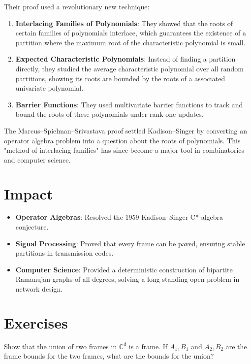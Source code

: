 Their proof used a revolutionary new technique:

\begin{enumerate}
\item \textbf{Interlacing Families of Polynomials}: They showed that the roots of certain families of polynomials interlace, which guarantees the existence of a partition where the maximum root of the characteristic polynomial is small.
\item \textbf{Expected Characteristic Polynomials}: Instead of finding a partition directly, they studied the average characteristic polynomial over all random partitions, showing its roots are bounded by the roots of a associated univariate polynomial.
\item \textbf{Barrier Functions}: They used multivariate barrier functions to track and bound the roots of these polynomials under rank-one updates.
\end{enumerate}

\begin{highlightbox}
The Marcus--Spielman--Srivastava proof settled Kadison--Singer by converting an operator algebra problem into a question about the roots of polynomials. This "method of interlacing families" has since become a major tool in combinatorics and computer science.
\end{highlightbox}

\section{Impact}
\begin{itemize}
\item \textbf{Operator Algebras}: Resolved the 1959 Kadison--Singer C*-algebra conjecture.
\item \textbf{Signal Processing}: Proved that every frame can be paved, ensuring stable partitions in transmission codes.
\item \textbf{Computer Science}: Provided a deterministic construction of bipartite Ramanujan graphs of all degrees, solving a long-standing open problem in network design.
\end{itemize}

\section{Exercises}

\begin{exercise}[Basic]
Show that the union of two frames in $\mathbb{C}^d$ is a frame. If $A_1, B_1$ and $A_2, B_2$ are the frame bounds for the two frames, what are the bounds for the union?
\end{exercise}

